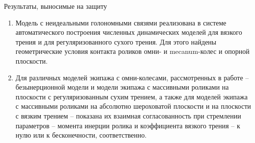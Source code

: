 \begin{myposter}{
    Результаты, выносимые на защиту
}
{{\begin{enumerate}
                        \item {
                            Модель с неидеальными голономными связями реализована в системе автоматического построения численных динамических моделей для вязкого трения и для регуляризованного сухого трения. Для этого найдены геометрические условия контакта роликов омни- и mecanum-колес и опорной плоскости.
                        }
                
                        \item {
                            Для различных моделей экипажа с омни-колесами, рассмотренных в работе -- безынерционной модели и модели экипажа с массивными роликами на плоскости с регуляризованным сухим трением, а также для моделей экипажа с массивными роликами на абсолютно шероховатой плоскости и на плоскости с вязким трением -- показана их взаимная согласованность
                            при стремлении параметров -- момента инерции ролика и коэффициента вязкого трения -- к нулю или к бесконечности, соответственно.
                        }
    
                \end{enumerate}

            \vspace{10pt}
        }
    }
    
\end{myposter}
